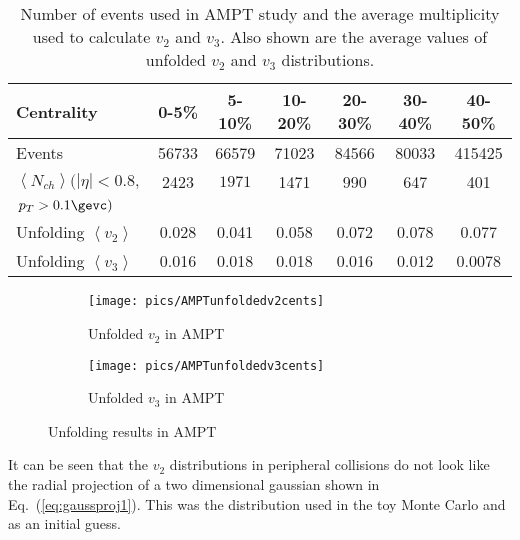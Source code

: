 \begin{table}[htbp]
\centering
\begin{tabular}{ l  | c | c | c | c | c | c}
\small Centrality 					&	0-5\%	&5-10\%	&10-20\%	&20-30\%	&30-40\%	&40-50\% \\
\hline
Events	& 56733	& 66579	 & 71023 & 84566	& 80033	& 415425 \\
$\left<N_{ch}\right>(|\eta|<0.8,$ & 2423  & $1971$ & 1471 & 990 & 647 & 401 \\
$\,p_T>0.1\gevc )$ & & & & & & \\

Unfolding $ \left<v_2\right>$&	0.028 & 0.041 & 0.058 & 0.072 & 0.078 & 0.077\\
Unfolding $ \left<v_3\right>$ & 	0.016 & 0.018 & 0.018 & 0.016 & 0.012 & 0.0078\\
\hline
\end{tabular}
\caption{Number of events used in AMPT study and the average multiplicity used to calculate $v_2$ and $v_3$. Also shown are the average values of unfolded $v_2$ and $v_3$ distributions.}
\label{tab:amptunfold}
\end{table}

\begin{figure}[htp]
	\centering
        \begin{subfigure}[b]{0.95\textwidth}
                \centering
          	\texttt{[image: pics/AMPTunfoldedv2cents]}
		\caption{Unfolded $v_2$ in AMPT}
	        	\label{fig:AMPTunfoldv2}
           \end{subfigure}
        \begin{subfigure}[b]{0.95\textwidth}
                \centering
          	\texttt{[image: pics/AMPTunfoldedv3cents]}
		\caption{Unfolded $v_3$ in AMPT}
			        	\label{fig:AMPTunfoldv3}
           \end{subfigure}
           \caption{Unfolding results in AMPT}
             \label{fig:AMPTunfoldvn}
\end{figure}

It can be seen that the $v_2$ distributions in peripheral collisions do not look like the radial projection of a two dimensional gaussian shown in Eq.~(\ref{eq:gaussproj1}). This was the distribution used in the toy Monte Carlo and as an initial guess. 

